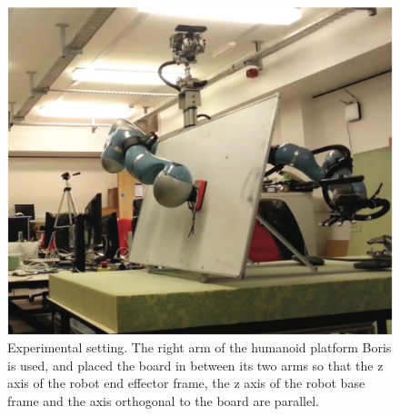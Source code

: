 \begin{figure}[h!]
  \centering
  \includegraphics[width=\linewidth]{images/whiteboard.pdf}
  \caption{Experimental setting. The right arm of the humanoid
    platform Boris is used, and placed the board in between its two arms so that the z
    axis of the robot end effector frame, the z axis of the robot base frame
    and the axis orthogonal to the board are parallel.}
  \label{whiteboard}
\end{figure}









